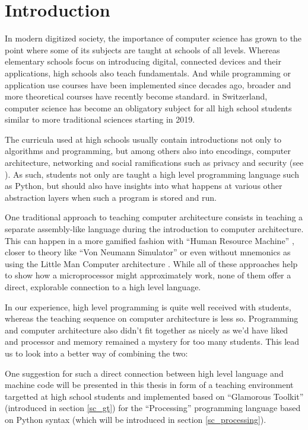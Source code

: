 
\chapter{Introduction}

In modern digitized society, the importance of computer science has grown to the point where some of its subjects are taught at schools of all levels. Whereas elementary schools focus on introducing digital, connected devices and their applications, high schools also teach fundamentals. And while programming or application use courses have been implemented since decades ago, broader and more theoretical courses have recently become standard. \eg in Switzerland, computer science has become an obligatory subject for all high school students similar to more traditional sciences starting in 2019.

The curricula used at high schools usually contain introductions not only to algorithms and programming, but among others also into encodings, computer architecture, networking and social ramifications such as privacy and security (see \eg \cite{Erz16}). As such, students not only are taught a high level programming language such as Python, but should also have insights into what happens at various other abstraction layers when such a program is stored and run.

One traditional approach to teaching computer architecture consists in teaching a separate assembly-like language during the introduction to computer architecture. This can happen in a more gamified fashion \eg with ``Human Resource Machine'' \cite{Tom15}, closer to theory like ``Von Neumann Simulator'' \cite{Gan23} or even without mnemonics as using the Little Man Computer architecture \cite{Oin25}. While all of these approaches help to show how a microprocessor might approximately work, none of them offer a direct, explorable connection to a high level language.

In our experience, high level programming is quite well received with students, whereas the teaching sequence on computer architecture is less so. Programming and computer architecture also didn't fit together as nicely as we'd have liked and processor and memory remained a mystery for too many students. This lead us to look into a better way of combining the two:

One suggestion for such a direct connection between high level language and machine code will be presented in this thesis in form of a teaching environment targetted at high school students and implemented based on ``Glamorous Toolkit'' (introduced in section \ref{sc_gt}) for the ``Processing'' programming language based on Python syntax (which will be introduced in section \ref{sc_processing}).

